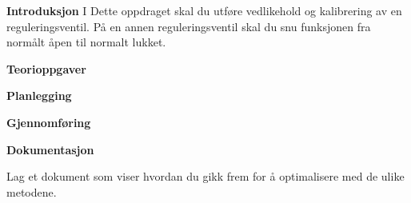 

\noindent

\vskip 5pt


\textbf{Introduksjon}
I Dette oppdraget skal du utføre vedlikehold og kalibrering av en reguleringsventil. På en annen reguleringsventil skal du snu funksjonen fra normålt åpen til normalt lukket. 




\textbf{Teorioppgaver}

\textbf{Planlegging}

\textbf{Gjennomføring}

\textbf{Dokumentasjon}

Lag et dokument som viser hvordan du gikk frem for å optimalisere med de ulike metodene. 


















\vfil \eject

















